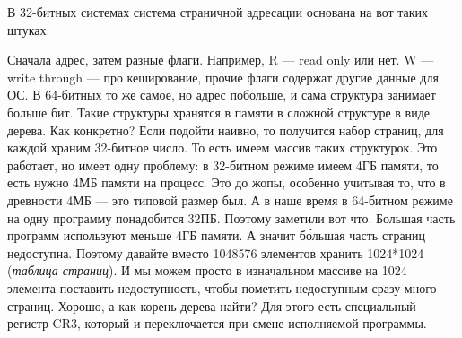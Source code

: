 \documentclass{article}
\begin{document}
    В 32-битных системах система страничной адресации основана на вот таких штуках:
    \begin{center}
    \end{center}
    Сначала адрес, затем разные флаги. Например, R --- read only или нет. W --- write through --- про кеширование, прочие флаги содержат другие данные для ОС. В 64-битных то же самое, но адрес побольше, и сама структура занимает больше бит. Такие структуры хранятся в памяти в сложной структуре в виде дерева. Как конкретно? Если подойти наивно, то получится набор страниц, для каждой храним 32-битное число. То есть имеем массив таких структурок. Это работает, но имеет одну проблему: в 32-битном режиме имеем 4ГБ памяти, то есть нужно 4МБ памяти на процесс. Это до жопы, особенно учитывая то, что в древности 4МБ --- это типовой размер был. А в наше время в 64-битном режиме на одну программу понадобится 32ПБ. Поэтому заметили вот что. Большая часть программ используют меньше 4ГБ памяти. А значит б\'{о}льшая часть страниц недоступна. Поэтому давайте вместо 1048576 элементов хранить 1024*1024 (\textit{таблица страниц}). И мы можем просто в изначальном массиве на 1024 элемента поставить недоступность, чтобы пометить недоступным сразу много страниц. Хорошо, а как корень дерева найти? Для этого есть специальный регистр CR3, который и переключается при смене исполняемой программы.
\end{document}
